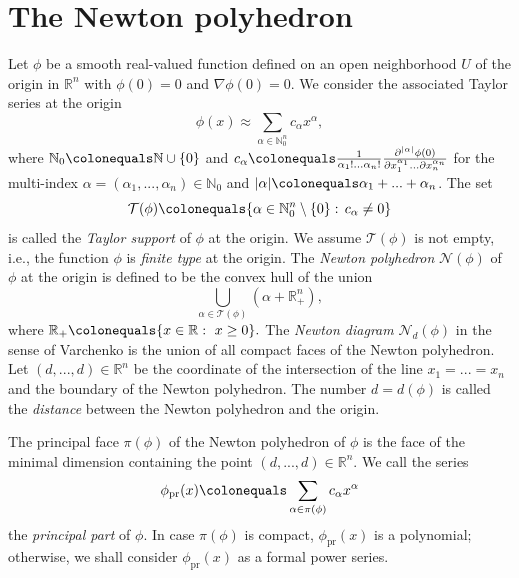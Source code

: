 \documentclass[a4paper, 11pt]{article}
\theoremstyle{plain}
\theoremstyle{definition}
\theoremstyle{lemma}
\theoremstyle{Remark}
\theoremstyle{proposition}
\theoremstyle{corollary}
\theoremstyle{example}
\theoremstyle{assumption}
\begin{document}
\section{The Newton polyhedron}
Let $\phi$ be a smooth real-valued function defined on an open neighborhood $U$ of the origin in $\mathbb{R}^n$ with $\phi(0)=0$ and $\nabla \phi(0)=0.$ We consider the associated Taylor series at the origin
$$\phi(x)\approx \sum_{\alpha \in \mathbb{N}_0^n}c_{\alpha}x^{\alpha},$$
where $\mathbb{N}_0\colonequals \mathbb{N}\cup \{0\}$ and   $ c_{\alpha}\colonequals  \frac{1}{\alpha_1!...\alpha_n!}\frac{\partial^{|\alpha|}\phi(0)}{\partial x_1^{\alpha_1}...\partial x_n^{\alpha_n}}$ for the multi-index $\alpha=(\alpha_1,...,\alpha_n)\in \mathbb{N}_0$ and $|\alpha|\colonequals \alpha_1+...+\alpha_n$. %
The set
$$\mathcal{T}(\phi)\colonequals \{\alpha \in \mathbb{N}_0^n\setminus \{0\}:\,c_{\alpha}\neq 0\}  $$
is called the \emph{Taylor support} of $\phi$ at the origin. We assume $\mathcal{T}(\phi)$ is not empty, i.e., the function $\phi$ is \emph{finite type} at the origin. The \emph{Newton polyhedron} $\mathcal{N}(\phi)$ of $\phi$ at the origin is defined to be the convex hull of the union $$\bigcup_{\alpha \in \mathcal{T}(\phi) } (\alpha+\mathbb{R}^n_+),$$
where $\mathbb{R}_+\colonequals \{x\in \mathbb{R}:\,\,x\geq 0\}.$ The \emph{Newton diagram } $\mathcal{N}_d(\phi)$ in the sense of Varchenko \cite{Var} is the union of all compact faces of the Newton polyhedron. %
 Let $(d,...,d)\in \mathbb{R}^n$ be the coordinate of the intersection of the line $x_1=...=x_n$ and the boundary of the Newton polyhedron. The number $d=d(\phi)$ is called the \emph{distance}  between the Newton polyhedron and the origin.


The principal face $\pi (\phi)$ of the Newton polyhedron of $\phi$ is the face of the minimal dimension containing the point $(d,...,d)\in \mathbb{R}^n.$ We call the series
$$\phi_{\text{pr}}(x)\colonequals \sum_{\alpha\in \pi (\phi) } c_{\alpha} x^{\alpha}$$
 the \emph{principal part} of $\phi.$ In case $\pi (\phi)$ is compact, $\phi_{\text{pr}}(x)$ is a %
  polynomial; otherwise, we shall consider $\phi_{\text{pr}}(x)$ as a formal power series.
\end{document}
